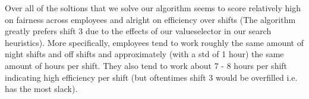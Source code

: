 Over all of the soltions that we solve our algorithm seems to score relatively high on fairness across employees
and alright on efficiency over shifts (The algorithm greatly prefers shift 3 due to the effects of our valueselector in our search heuristics). 
More specifically, employees tend to work roughly the same amount of night shifts and off shifts and approximately (with a std of 1 hour) the same amount of hours per shift. 
They also tend to work about 7 - 8 hours per shift indicating high efficiency per shift (but oftentimes shift 3 would be overfilled i.e. has the most slack). 
